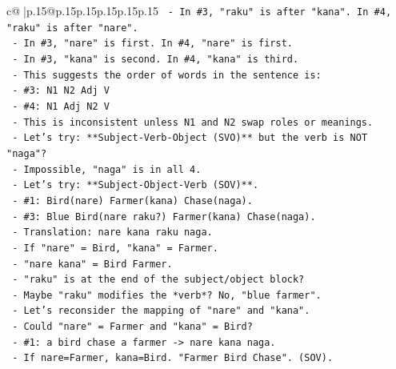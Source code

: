 \documentclass{article}
\begin{document}
{\begin{supertabular}{c@{$\;$}|p{.15\linewidth}@{}p{.15\linewidth}p{.15\linewidth}p{.15\linewidth}p{.15\linewidth}p{.15\linewidth}}
{{{\texttt{                     {-} In \#3, "raku" is after "kana". In \#4, "raku" is after "nare".} \\
\texttt{                     {-} In \#3, "nare" is first. In \#4, "nare" is first.} \\
\texttt{                     {-} In \#3, "kana" is second. In \#4, "kana" is third.} \\
\texttt{                     {-} This suggests the order of words in the sentence is:} \\
\texttt{                       {-} \#3: N1 N2 Adj V} \\
\texttt{                       {-} \#4: N1 Adj N2 V} \\
\texttt{                     {-} This is inconsistent unless N1 and N2 swap roles or meanings.} \\
\texttt{                     {-} Let's try: **Subject{-}Verb{-}Object (SVO)** but the verb is NOT "naga"?} \\
\texttt{                       {-} Impossible, "naga" is in all 4.} \\
\texttt{                     {-} Let's try: **Subject{-}Object{-}Verb (SOV)**.} \\
\texttt{                       {-} \#1: Bird(nare) Farmer(kana) Chase(naga).} \\
\texttt{                       {-} \#3: Blue Bird(nare raku?) Farmer(kana) Chase(naga).} \\
\texttt{                         {-} Translation: nare kana raku naga.} \\
\texttt{                         {-} If "nare" = Bird, "kana" = Farmer.} \\
\texttt{                         {-} "nare kana" = Bird Farmer.} \\
\texttt{                         {-} "raku" is at the end of the subject/object block?} \\
\texttt{                         {-} Maybe "raku" modifies the *verb*? No, "blue farmer".} \\
\texttt{                     {-} Let's reconsider the mapping of "nare" and "kana".} \\
\texttt{                       {-} Could "nare" = Farmer and "kana" = Bird?} \\
\texttt{                         {-} \#1: a bird chase a farmer {-}> nare kana naga.} \\
\texttt{                           {-} If nare=Farmer, kana=Bird. "Farmer Bird Chase". (SOV).} \\
}}}
\end{supertabular}}
\end{document}
